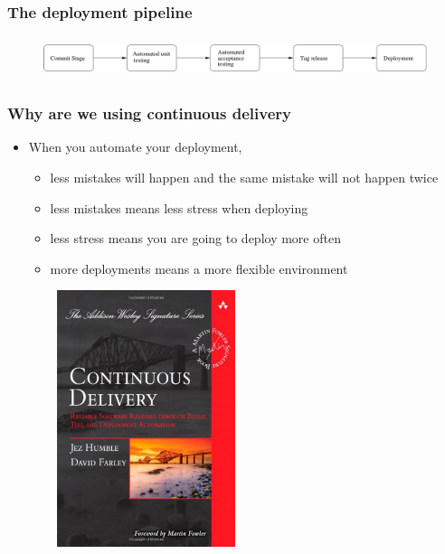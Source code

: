 \documentclass{beamer}
\begin{document}
\begin{frame}
  \frametitle{The deployment pipeline}
  \begin{figure}[ht]
    \centering
      \includegraphics[height=1.2cm,width=11.5cm]{../pics/deployment_pipline}
    \label{fig:stack}
  \end{figure}
\end{frame}

\begin{frame}
  \frametitle{Why are we using continuous delivery}

  \begin{itemize}
  \item<1-> When you automate your deployment,
    \begin{itemize}
    \item<2-> less mistakes will happen and the same mistake will not happen twice
    \item<3-> less mistakes means less stress when deploying
    \item<4-> less stress means you are going to deploy more often
    \item<5-> more deployments means a more flexible environment
    \end{itemize}
  \end{itemize}
\end{frame}

\begin{frame}
  \begin{figure}[ht]
    \centering
      \includegraphics[height=7.5cm,width=6cm]{../pics/cd_book}
    \label{fig:stack}
  \end{figure}
\end{frame}
\end{document}
